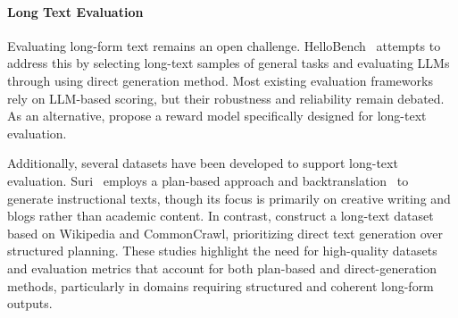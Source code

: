 \paragraph{Long Text Evaluation}
Evaluating long-form text remains an open challenge. HelloBench~\cite{que2024hellobench} attempts to address this by selecting long-text samples of general tasks and evaluating LLMs through using direct generation method. Most existing evaluation frameworks rely on LLM-based scoring, but their robustness and reliability remain debated. As an alternative, \citet{zhang2024longreward} propose a reward model specifically designed for long-text evaluation. 

Additionally, several datasets have been developed to support long-text evaluation. Suri~\cite{pham2024surimulticonstraintinstructionfollowing} employs a plan-based approach and backtranslation~\cite{li2024selfalignmentinstructionbacktranslation, köksal2024longformeffectiveinstructiontuning} to generate instructional texts, though its focus is primarily on creative writing and blogs rather than academic content. In contrast, \citet{köksal2024longformeffectiveinstructiontuning} construct a long-text dataset based on Wikipedia and CommonCrawl, prioritizing direct text generation over structured planning. These studies highlight the need for high-quality datasets and evaluation metrics that account for both plan-based and direct-generation methods, particularly in domains requiring structured and coherent long-form outputs.




